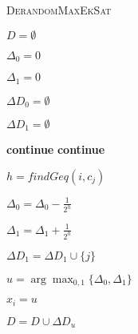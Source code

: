 \begin{algorithm}[h]
	\caption{\textsc{DerandomMaxEkSat}}
	\label{algo:DerandomMaxEkSat}

	$D = \emptyset$ 

	{
		$\Delta_0 = 0$

		$\Delta_1 = 0$

		$\Delta D_0 = \emptyset$

		$\Delta D_1 = \emptyset$

		{
			{
				\textbf{continue}
			}
			{
				\textbf{continue}
			}

			$h = findGeq(i, c_j)$ 

			{

				$\Delta_0 = \Delta_0 - \frac{1}{2^h}$

				$\Delta_1 = \Delta_1 + \frac{1}{2^h}$

				$\Delta D_1 = \Delta D_1 \cup \{j\}$

			} 

		}

		$ u = \arg \max_{0,1} \{\Delta_0, \Delta_1\}$

		$x_i = u$

		$D = D \cup \Delta D_u$
	}
\end{algorithm}

